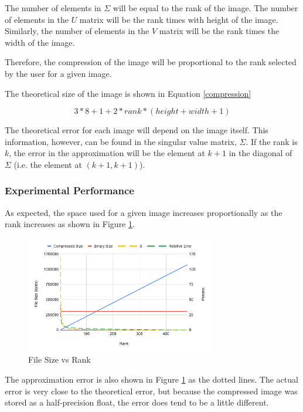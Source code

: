 \documentclass[conference]{IEEEtran}
\begin{document}
The number of elements in $\Sigma$ will be equal to the rank of the image. 
The number of elements in the $U$ matrix will be the rank times with height of the image.
Similarly, the number of elements in the $V$ matrix will be the rank times the width of the image.

Therefore, the compression of the image will be proportional to the rank selected by the user for 
a given image. 

The theoretical size of the image is shown in Equation \ref{compression}

\begin{equation}
\label{compression}
		3*8 + 1 + 2*rank*(height + width + 1)
\end{equation}

The theoretical error for each image will depend on the image itself. This information, however, can 
be found in the singular value matrix, $\Sigma$. If the rank is $k$, the error in the approximation 
will be the element at $k+1$ in the diagonal of $\Sigma$ (i.e. the element at $(k+1, k+1)$).

\subsubsection{Experimental Performance}

As expected, the space used for a given image increases proportionally as the rank increases
as shown in Figure \ref{size_vs_rank}.

\begin{figure}
	\centering
	\includegraphics[width=3.25in]{compression.png}
	\caption{File Size vs Rank}
	\label{size_vs_rank}
\end{figure}

The approximation error is also shown in Figure \ref{size_vs_rank} as the dotted lines. The actual
error is very close to the theoretical error, but because the compressed image was stored as a 
half-precision float, the error does tend to be a little different.
\end{document}
